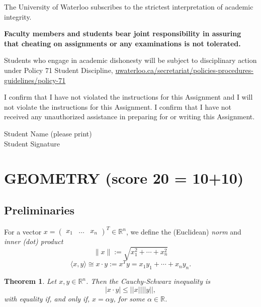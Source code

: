 \documentclass[12pt]{article}
\numberwithin{equation}{section}  %
\numberwithin{table}{section}
\numberwithin{algorithm}{section}
\def\R{\mathbb{R}}
\def\Rn{\mathbb{R}^n}
\newtheorem{theorem}{Theorem}[section]
\theoremstyle{definition}
\newcommand{\<}{\langle}
\renewcommand{\>}{\rangle}
\begin{document}
\newpage



The University of Waterloo subscribes to the strictest interpretation of
academic integrity.

{\bf Faculty members and students bear joint responsibility in assuring
 that cheating on assignments or any examinations is not tolerated.
}

Students who engage in academic dishonesty will be subject to disciplinary action under Policy 71 Student
Discipline, 
\href{https://uwaterloo.ca/secretariat/policies-procedures-guidelines/policy-71}
{uwaterloo.ca/secretariat/policies-procedures-guidelines/policy-71}


\vspace{2in}
I confirm that I have not violated the instructions for this Assignment and I will not violate
the instructions for this Assignment.
I confirm that I have not received any unauthorized assistance in preparing for or writing
this Assignment.


Student Name (please print)
\\Student Signature

\newpage

\tableofcontents



\newpage
\section{GEOMETRY
{\small(score 20 = 10+10)}
}


\subsection{Preliminaries}
For a vector $x=\begin{pmatrix} x_1 & \ldots & x_n\end{pmatrix}^T \in \Rn$, 
we define the (Euclidean) {\em norm} and {\em inner (dot) product}
\[  
\|x\| := \sqrt{x_1^2+ \cdots+ x_n^2}
\]
\[  \langle x,y\rangle \cong x \cdot y := x^Ty = x_1y_1+ \cdots+ x_ny_n.
\]
\begin{theorem}
\label{thm:CauchySchwarz}
 Let $x,y\in \Rn$. Then the Cauchy-Schwarz inequality is
\[
|x \cdot y| \leq ||x||||y||,
\]
with equality if, and only if, $x=\alpha y$, for some $\alpha\in \R$.
\end{theorem}
\end{document}
